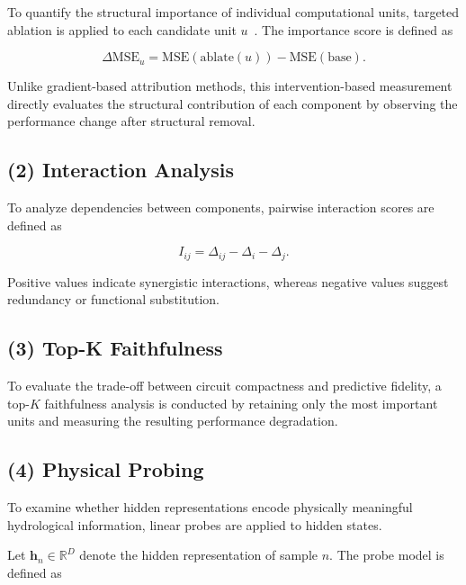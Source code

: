 \documentclass[11pt]{article}
\begin{document}
To quantify the structural importance of individual computational units, targeted ablation is applied to each candidate unit $u$~\cite{morcos2018importancesingledirectionsgeneralization}. The importance score is defined as

\begin{equation}
    \Delta \mathrm{MSE}_{u}=\mathrm{MSE}(\mathrm{ablate}(u))-\mathrm{MSE}(\mathrm{base}).
    \label{eq:Delta_MSE}
\end{equation}

Unlike gradient-based attribution methods, this intervention-based measurement directly evaluates the structural contribution of each component by observing the performance change after structural removal\cite{wang2022interpretabilitywildcircuitindirect}.

\subsection*{(2) Interaction Analysis}

To analyze dependencies between components, pairwise interaction scores are defined as

\begin{equation}
    I_{ij}=\Delta_{ij}-\Delta_i-\Delta_j.
    \label{eq:interaction}
\end{equation}

Positive values indicate synergistic interactions, whereas negative values suggest redundancy or functional substitution.

\subsection*{(3) Top-K Faithfulness}

To evaluate the trade-off between circuit compactness and predictive fidelity, a top-$K$ faithfulness analysis is conducted by retaining only the most important units and measuring the resulting performance degradation\cite{7552539}.

\subsection*{(4) Physical Probing}

To examine whether hidden representations encode physically meaningful hydrological information, linear probes are applied to hidden states\cite{pmlr-v97-verma19a}.

Let $\mathbf{h}_n\in\mathbb{R}^{D}$ denote the hidden representation of sample $n$. The probe model is defined as
\end{document}
